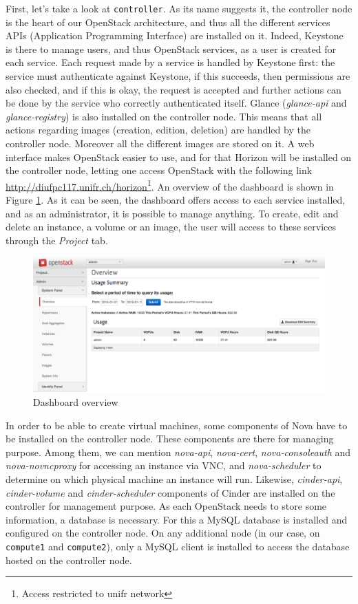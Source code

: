 First, let's take a look at \texttt{controller}. 
As its name suggests it, the controller node is the heart of our OpenStack architecture, and thus all the different services APIs (Application Programming Interface) are installed on it. 
Indeed, Keystone is there to manage users, and thus OpenStack services, as a user is created for each service. 
Each request made by a service is handled by Keystone first: the service must authenticate against Keystone, if this succeeds, then permissions are also checked, and if this is okay, the request is accepted and further actions can be done by the service who correctly authenticated itself. 
Glance (\textit{glance-api} and \textit{glance-registry}) is also installed on the controller node. 
This means that all actions regarding images (creation, edition, deletion) are handled by the controller node. 
Moreover all the different images are stored on it.
A web interface makes OpenStack easier to use, and for that Horizon will be installed on the controller node, letting one access OpenStack with the following link \url{http://diufpc117.unifr.ch/horizon}\footnote{Access restricted to unifr network}. 
An overview of the dashboard is shown in Figure \ref{fig:dashboard}. 
As it can be seen, the dashboard offers access to each service installed, and as an administrator, it is possible to manage anything. 
To create, edit and delete an instance, a volume or an image, the user will access to these services through the \textit{Project} tab.
%
\begin{figure}[h]
	\centering
	\includegraphics[scale=0.36]{figures/dashboard.png}
	\caption{Dashboard overview}
	\label{fig:dashboard}
\end{figure}
%
In order to be able to create virtual machines, some components of Nova have to be installed on the controller node. These components are there for managing purpose. 
Among them, we can mention \textit{nova-api}, \textit{nova-cert}, \textit{nova-consoleauth} and \textit{nova-novncproxy} for accessing an instance via VNC, and \textit{nova-scheduler} to determine on which physical machine an instance will run.
Likewise, \textit{cinder-api}, \textit{cinder-volume} and \textit{cinder-scheduler} components of Cinder are installed on the controller for management purpose.
As each OpenStack needs to store some information, a database is necessary. 
For this a MySQL database is installed and configured on the controller node. 
On any additional node (in our case, on \texttt{compute1} and \texttt{compute2}), only a MySQL client is installed to access the database hosted on the controller node.


